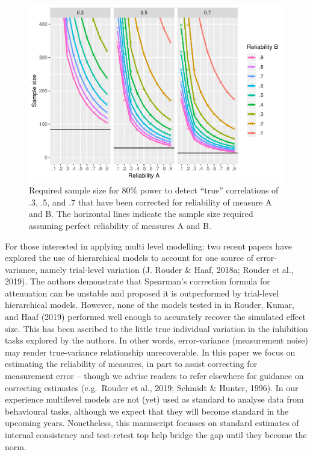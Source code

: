 \documentclass[english,,man,floatsintext]{apa6}
\begin{document}
\begin{figure}
\centering
\includegraphics{Parsons_Kruijt_Fox_-_reporting_reliability_files/figure-latex/figuretwo-1.pdf}
\caption{\label{fig:figuretwo}Required sample size for 80\% power to detect \enquote{true} correlations of .3, .5, and .7 that have been corrected for reliability of measure A and B. The horizontal lines indicate the sample size required assuming perfect reliability of measures A and B.}
\end{figure}

For those interested in applying multi level modelling: two recent papers have explored the use of hierarchical models to account for one source of error-variance, namely trial-level variation (J. Rouder \& Haaf, 2018a; Rouder et al., 2019). The authors demonstrate that Spearman's correction formula for attenuation can be unstable and proposed it is outperformed by trial-level hierarchical models. However, none of the models tested in in Rouder, Kumar, and Haaf (2019) performed well enough to accurately recover the simulated effect size. This has been ascribed to the little true individual variation in the inhibition tasks explored by the authors. In other words, error-variance (measurement noise) may render true-variance relationship unrecoverable. In this paper we focus on estimating the reliability of measures, in part to assist correcting for measurement error -- though we advise readers to refer elsewhere for guidance on correcting estimates (e.g.~Rouder et al., 2019; Schmidt \& Hunter, 1996). In our experience multilevel models are not (yet) used as standard to analyse data from behavioural tasks, although we expect that they will become standard in the upcoming years. Nonetheless, this manuscript focusses on standard estimates of internal consistency and test-retest top help bridge the gap until they become the norm.
\end{document}
